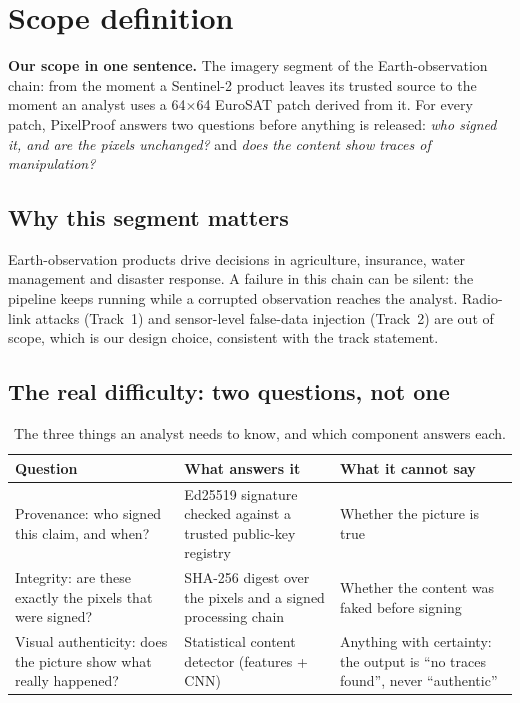 \section{Scope definition}\label{sec:scope}
\begin{keybox}
\textbf{Our scope in one sentence.} The imagery segment of the Earth-observation chain: from the moment a Sentinel-2 product leaves its trusted source to the moment an analyst uses a 64$\times$64 EuroSAT patch derived from it. For every patch, PixelProof answers two questions before anything is released: \emph{who signed it, and are the pixels unchanged?} and \emph{does the content show traces of manipulation?}
\end{keybox}

\subsection{Why this segment matters}
Earth-observation products drive decisions in agriculture, insurance, water management and disaster response. A failure in this chain can be silent: the pipeline keeps running while a corrupted observation reaches the analyst. Radio-link attacks (Track~1) and sensor-level false-data injection (Track~2) are out of scope, which is our design choice, consistent with the track statement.

\subsection{The real difficulty: two questions, not one}
\begin{table}[!htbp]
\centering\small
\begin{tabularx}{\textwidth}{|L{3.3cm}|Y|Y|}
\hline
\textbf{Question} & \textbf{What answers it} & \textbf{What it cannot say}\\
\hline
Provenance: who signed this claim, and when? & Ed25519 signature checked against a trusted public-key registry & Whether the picture is true\\
\hline
Integrity: are these exactly the pixels that were signed? & SHA-256 digest over the pixels and a signed processing chain & Whether the content was faked before signing\\
\hline
Visual authenticity: does the picture show what really happened? & Statistical content detector (features + CNN) & Anything with certainty: the output is ``no traces found'', never ``authentic''\\
\hline
\end{tabularx}
\caption{The three things an analyst needs to know, and which component answers each.}
\end{table}

